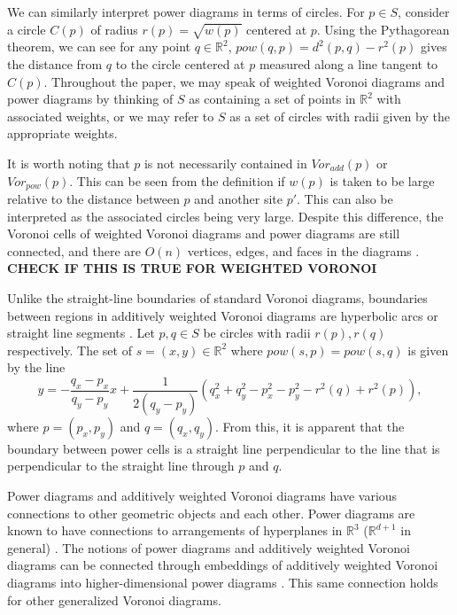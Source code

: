 \documentclass[a4paper, 11pt]{article}
\newcommand{\R}{\mathbb{R}}
\begin{document}
We can similarly interpret power diagrams in terms of circles. For $p \in S$, consider a circle $C(p)$ of radius $r(p) = \sqrt{w(p)}$ centered at $p$. Using the
Pythagorean theorem, we can see for any point $q \in \R^2$, $pow(q,p) = d^2(p,q) - r^2(p)$ gives the distance from $q$ to the circle centered at $p$
measured along a line tangent to $C(p)$. Throughout the paper, we may speak of weighted Voronoi diagrams and power diagrams by thinking of $S$ as
containing a set of points in $\R^2$ with associated weights, or we may refer to $S$ as a set of circles with radii given by the appropriate weights.

It is worth noting that $p$ is not necessarily contained in $Vor_{add}(p)$ or $Vor_{pow}(p)$. This can be seen from the definition if $w(p)$ is taken
to be large relative to the distance between $p$ and another site $p'$. This can also be interpreted as the associated circles being very large.
Despite this difference, the Voronoi cells of weighted Voronoi diagrams and power diagrams are still connected, and there are $O(n)$ vertices, edges,
and faces in the diagrams \cite{aurenhammer_power}. \textbf{CHECK IF THIS IS TRUE FOR WEIGHTED VORONOI}

Unlike the straight-line boundaries of standard
Voronoi diagrams, boundaries between regions in additively weighted Voronoi diagrams are hyperbolic arcs or straight line segments
\cite{aurenhammer_additive}. Let $p, q \in S$ be circles with radii $r(p), r(q)$ respectively. The set of $s = (x,y) \in \R^2$ where $pow(s,p) = pow(s,q)$
is given by the line
\begin{equation}
  y = -\frac{q_x - p_x}{q_y - p_y} x + \frac{1}{2(q_y - p_y)} \left(q_x^2 + q_y^2 - p_x^2 - p_y^2 - r^2(q) + r^2(p) \right),
  \label{eq:pow_intersect}
\end{equation}
where $p = (p_x, p_y)$ and $q = (q_x, q_y)$. From this, it is apparent that the boundary between power cells is a straight line perpendicular to the
line that is perpendicular to the straight line through $p$ and $q$.

Power diagrams and additively weighted Voronoi diagrams have various connections to other geometric objects and each other.
Power diagrams are known to have connections to arrangements of hyperplanes in $\R^3$ ($\R^{d+1}$ in general) \cite{aurenhammer_survey}. The notions
of power diagrams and additively weighted Voronoi diagrams can be connected through embeddings of additively weighted Voronoi diagrams into
higher-dimensional power diagrams \cite{aurenhammer_additive}. This same connection holds for other generalized Voronoi diagrams.
\end{document}
